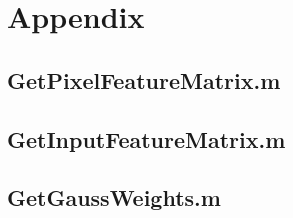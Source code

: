 \newpage
\section{Appendix}\label{Appendix}
\subsection{GetPixelFeatureMatrix.m}\label{GetPixelFeatureMatrix}

\subsection{GetInputFeatureMatrix.m}\label{GetInputFeatureMatrix}

\subsection{GetGaussWeights.m}\label{GetGaussWeights}
